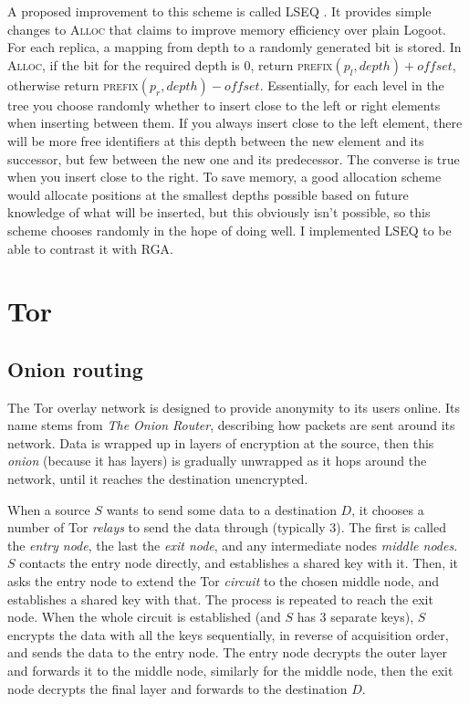 \documentclass[diss.tex]{subfiles}
\begin{document}
A proposed improvement to this scheme is called LSEQ \cite{lseq}. It provides simple changes to \textsc{Alloc} that claims to improve memory efficiency over plain Logoot. For each replica, a mapping from depth to a randomly generated bit is stored. In \textsc{Alloc}, if the bit for the required depth is 0, return \textsc{prefix}$(p_l, depth) + o\!f\!f\!set$, otherwise return \textsc{prefix}$(p_r, depth) - o\!f\!f\!set$. Essentially, for each level in the tree you choose randomly whether to insert close to the left or right elements when inserting between them. If you always insert close to the left element, there will be more free identifiers at this depth between the new element and its successor, but few between the new one and its predecessor. The converse is true when you insert close to the right. To save memory, a good allocation scheme would allocate positions at the smallest depths possible based on future knowledge of what will be inserted, but this obviously isn't possible, so this scheme chooses randomly in the hope of doing well. I implemented LSEQ to be able to contrast it with RGA.
%
%
%

\section{Tor}
\subsection{Onion routing}
The Tor \cite{tor} overlay network is designed to provide anonymity to its users online. Its name stems from \textit{The Onion Router}, describing how packets are sent around its network. Data is wrapped up in layers of encryption at the source, then this \textit{onion} (because it has layers) is gradually unwrapped as it hops around the network, until it reaches the destination unencrypted.

When a source $S$ wants to send some data to a destination $D$, it chooses a number of Tor \textit{relays} to send the data through (typically 3). The first is called the \textit{entry node}, the last the \textit{exit node}, and any intermediate nodes \textit{middle nodes}. $S$ contacts the entry node directly, and establishes a shared key with it. Then, it asks the entry node to extend the Tor \textit{circuit} to the chosen middle node, and establishes a shared key with that. The process is repeated to reach the exit node. When the whole circuit is established (and $S$ has 3 separate keys), $S$ encrypts the data with all the keys sequentially, in reverse of acquisition order, and sends the data to the entry node. The entry node decrypts the outer layer and forwards it to the middle node, similarly for the middle node, then the exit node decrypts the final layer and forwards to the destination $D$.
\end{document}
